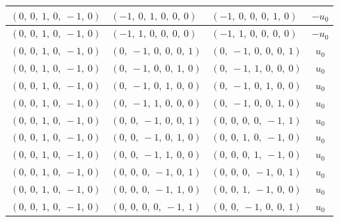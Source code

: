 \documentclass[11pt]{article}
\theoremstyle{definition}
\begin{document}
\begin{longtable}{|l|l|l|c|}
    \hline
    $\left( 0, \  0, \  1, \  0, \  -1, \  0\right)$ & $\left( -1, \  0, \  1, \  0, \  0, \  0\right)$ & $\left( -1, \  0, \  0, \  0, \  1, \  0\right)$ & $- u_{0}$ \\
    \hline
    $\left( 0, \  0, \  1, \  0, \  -1, \  0\right)$ & $\left( -1, \  1, \  0, \  0, \  0, \  0\right)$ & $\left( -1, \  1, \  0, \  0, \  0, \  0\right)$ & $- u_{0}$ \\
    \hline
    $\left( 0, \  0, \  1, \  0, \  -1, \  0\right)$ & $\left( 0, \  -1, \  0, \  0, \  0, \  1\right)$ & $\left( 0, \  -1, \  0, \  0, \  0, \  1\right)$ & $u_{0}$ \\
    \hline
    $\left( 0, \  0, \  1, \  0, \  -1, \  0\right)$ & $\left( 0, \  -1, \  0, \  0, \  1, \  0\right)$ & $\left( 0, \  -1, \  1, \  0, \  0, \  0\right)$ & $u_{0}$ \\
    \hline
    $\left( 0, \  0, \  1, \  0, \  -1, \  0\right)$ & $\left( 0, \  -1, \  0, \  1, \  0, \  0\right)$ & $\left( 0, \  -1, \  0, \  1, \  0, \  0\right)$ & $u_{0}$ \\
    \hline
    $\left( 0, \  0, \  1, \  0, \  -1, \  0\right)$ & $\left( 0, \  -1, \  1, \  0, \  0, \  0\right)$ & $\left( 0, \  -1, \  0, \  0, \  1, \  0\right)$ & $u_{0}$ \\
    \hline
    $\left( 0, \  0, \  1, \  0, \  -1, \  0\right)$ & $\left( 0, \  0, \  -1, \  0, \  0, \  1\right)$ & $\left( 0, \  0, \  0, \  0, \  -1, \  1\right)$ & $u_{0}$ \\
    \hline
    $\left( 0, \  0, \  1, \  0, \  -1, \  0\right)$ & $\left( 0, \  0, \  -1, \  0, \  1, \  0\right)$ & $\left( 0, \  0, \  1, \  0, \  -1, \  0\right)$ & $u_{0}$ \\
    \hline
    $\left( 0, \  0, \  1, \  0, \  -1, \  0\right)$ & $\left( 0, \  0, \  -1, \  1, \  0, \  0\right)$ & $\left( 0, \  0, \  0, \  1, \  -1, \  0\right)$ & $u_{0}$ \\
    \hline
    $\left( 0, \  0, \  1, \  0, \  -1, \  0\right)$ & $\left( 0, \  0, \  0, \  -1, \  0, \  1\right)$ & $\left( 0, \  0, \  0, \  -1, \  0, \  1\right)$ & $u_{0}$ \\
    \hline
    $\left( 0, \  0, \  1, \  0, \  -1, \  0\right)$ & $\left( 0, \  0, \  0, \  -1, \  1, \  0\right)$ & $\left( 0, \  0, \  1, \  -1, \  0, \  0\right)$ & $u_{0}$ \\
    \hline
    $\left( 0, \  0, \  1, \  0, \  -1, \  0\right)$ & $\left( 0, \  0, \  0, \  0, \  -1, \  1\right)$ & $\left( 0, \  0, \  -1, \  0, \  0, \  1\right)$ & $u_{0}$ \\

\end{longtable}
\end{document}
